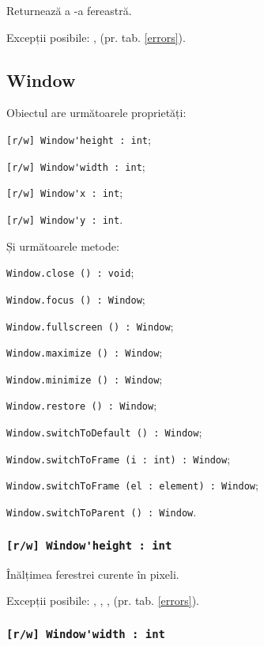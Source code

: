 Returnează a -a fereastră.

Excepții posibile: ,  (pr. tab. \ref{errors}).

\subsection{{\color{orange} Window}}

Obiectul \window{} are următoarele proprietăți:
\begin{icItems}
	\item \lstinline|[r/w] Window'height : int|;
	\item \lstinline|[r/w] Window'width : int|;
	\item \lstinline|[r/w] Window'x : int|;
	\item \lstinline|[r/w] Window'y : int|.
\end{icItems}

Și următoarele metode:
\begin{icItems}
	\item \lstinline|Window.close () : void|;
	\item \lstinline|Window.focus () : Window|;
	\item \lstinline|Window.fullscreen () : Window|;
	\item \lstinline|Window.maximize () : Window|;
	\item \lstinline|Window.minimize () : Window|;
	\item \lstinline|Window.restore () : Window|;
	\item \lstinline|Window.switchToDefault () : Window|;
	\item \lstinline|Window.switchToFrame (i : int) : Window|;
	\item \lstinline|Window.switchToFrame (el : element) : Window|;
	\item \lstinline|Window.switchToParent () : Window|.
\end{icItems}

\subsubsection{\lstinline|[r/w] Window'height : int|}

Înălțimea ferestrei curente în pixeli.

Excepții posibile: , , ,  (pr. tab. \ref{errors}).

\subsubsection{\lstinline|[r/w] Window'width : int|}

